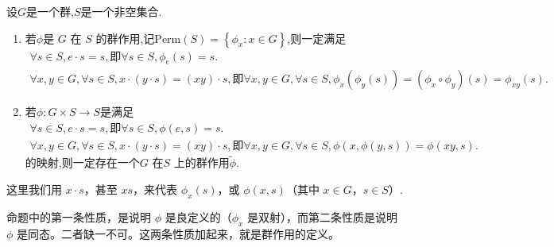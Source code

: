 \documentclass[../../main.tex]{subfiles}
\begin{document}
\begin{proposition}[群作用的等价条件]\label{proposition:群作用的等价条件}
设$G$是一个群,$S$是一个非空集合.
\begin{enumerate}[(1)]
\item 若$\phi$是 \(G\) 在 \(S\) 的群作用,记$\mathrm{Perm}\left( S \right) =\left\{ \phi _x:x\in G \right\}$,则一定满足
\begin{gather*}
\forall s\in S,e\cdot s=s,\text{即}\forall s\in S,\phi _e\left( s \right) =s.
\\
\forall x,y\in G,\forall s\in S,x\cdot (y\cdot s)=(xy)\cdot s,\text{即}\forall x,y\in G,\forall s\in S,\phi _x\left( \phi _y\left( s \right) \right) =(\phi _x\circ \phi _y)\left( s \right) =\phi _{xy}\left( s \right) .
\end{gather*}

\item 若$\phi :G\times S\rightarrow S$是满足
\begin{gather*}
\forall s\in S,e\cdot s=s,\text{即}\forall s\in S,\phi \left( e,s \right) =s.
\\
\forall x,y\in G,\forall s\in S,x\cdot (y\cdot s)=(xy)\cdot s,\text{即}\forall x,y\in G,\forall s\in S,\phi \left( x,\phi \left( y,s \right) \right) =\phi \left( xy,s \right) .
\end{gather*}
的映射,则一定存在一个\(G\) 在\(S\) 上的群作用$\widetilde{\phi }$.
\end{enumerate}
\end{proposition}
\begin{remark}
这里我们用 \(x \cdot s\)，甚至 \(xs\)，来代表 \(\phi_x(s)\)，或 \(\phi(x, s)\)（其中 \(x \in G\)，\(s \in S\)）.
\end{remark}
\begin{note}
命题中的第一条性质，是说明 \(\phi\) 是良定义的（\(\phi_x\) 是双射），而第二条性质是说明 \(\phi\) 是同态。二者缺一不可。这两条性质加起来，就是群作用的定义。
\end{note}
\end{document}
